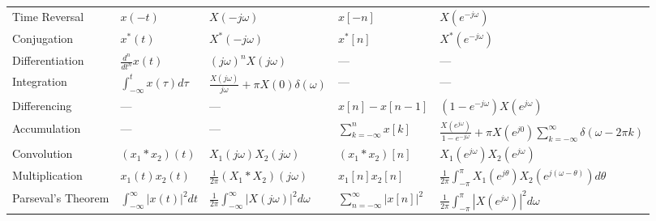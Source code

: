 \documentclass[8pt]{article}
\begin{document}
\begin{multicols}{2}
\begin{table*}[ht]
\begin{tabular}{@{}lllll@{}}
            Time Reversal      & $x(-t)$                             & $X(-j\omega)$                                                 & $x[-n]$                            & $X(e^{-j\omega})$                                                                                       \\ [1mm]
            Conjugation        & $x^*(t)$                            & $X^*(-j\omega)$                                               & $x^*[n]$                           & $X^*(e^{-j\omega})$                                                                                     \\ [1mm]
            Differentiation    & $\frac{d^n}{dt^n}x(t)$              & $(j\omega)^n X(j\omega)$                                      & ---                                & ---                                                                                                     \\ [1mm]
            Integration        & $\int_{-\infty}^t x(\tau) d\tau$    & $\frac{X(j\omega)}{j\omega} + \pi X(0)\delta(\omega)$         & ---                                & ---                                                                                                     \\ [1mm]
            Differencing       & ---                                 & ---                                                           & $x[n] - x[n-1]$                    & $(1 - e^{-j\omega})X(e^{j\omega})$                                                                      \\ [1mm]
            Accumulation       & ---                                 & ---                                                           & $\sum_{k=-\infty}^n x[k]$          & $\frac{X(e^{j\omega})}{1-e^{-j\omega}} + \pi X(e^{j0})\sum_{k=-\infty}^{\infty}\delta(\omega - 2\pi k)$ \\ [1mm]
            Convolution        & $(x_1 * x_2)(t)$                    & $X_1(j\omega) X_2(j\omega)$                                   & $(x_1 * x_2)[n]$                   & $X_1(e^{j\omega}) X_2(e^{j\omega})$                                                                     \\ [1mm]
            Multiplication     & $x_1(t)x_2(t)$                      & $\frac{1}{2\pi}(X_1 * X_2)(j\omega)$                          & $x_1[n]x_2[n]$                     & $\frac{1}{2\pi}\int_{-\pi}^{\pi} X_1(e^{j\theta}) X_2(e^{j(\omega-\theta)}) d\theta$                    \\ [1mm]
            Parseval's Theorem & $\int_{-\infty}^\infty |x(t)|^2 dt$ & $\frac{1}{2\pi} \int_{-\infty}^\infty |X(j\omega)|^2 d\omega$ & $\sum_{n=-\infty}^\infty |x[n]|^2$ & $\frac{1}{2\pi} \int_{-\pi}^{\pi} |X(e^{j\omega})|^2 d\omega$                                           \\
            \bottomrule
        \end{tabular}
    \end{table*}


\end{multicols}
\end{document}
